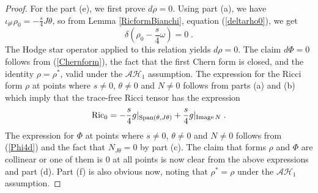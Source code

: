 \documentclass{amsart}
\begin{document}
\begin{proof}
  
For the part (e), we first prove $d \rho = 0$.
Using part (a), we have $\iota_{\theta^\sharp} \rho_0 = -\frac{s}{4} J\theta$, so from Lemma \ref{RicformBianchi}, equation (\ref{deltarho0}), we get 
\begin{equation} \label{delrho0}
     \delta \left( \rho_0 - \frac{s}{4}  \omega \right)  = 0 \; . 
\end{equation} 
The Hodge star operator applied to this relation yields $d \rho = 0$. The claim $d \Phi = 0$ follows from (\ref{Chernform}), the fact that the first Chern form is closed, and the identity $\rho = \rho^*$, valid under the $\mathcal{AH}_1$ assumption. The expression for the Ricci form $\rho$
at points where $s\neq 0$, $\theta \neq 0$ and $N\neq 0$ follows from  parts (a) and (b) which imply that the trace-free Ricci tensor has the expression
$$ {\rm Ric}_0 = - \frac{s}{4} g|_{{\rm Span}(\theta, J\theta)} + \frac{s}{4} g|_{{\rm Image} \, N} \; .$$
The expression for $\Phi$ at points where $s\neq 0$, $\theta \neq 0$ and $N\neq 0$ follows from (\ref{Phi4d}) and the fact that $N_{J\theta} = 0$ by part (c). The claim that forms $\rho$ and $\Phi$ are collinear or one of them is $0$ at all points is now clear from the above expressions and part (d). Part (f) is also obvious now, noting that $\rho^* = \rho$ under the $\mathcal{AH}_1$ assumption.



  
\end{proof}
\end{document}
